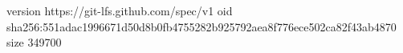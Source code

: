version https://git-lfs.github.com/spec/v1
oid sha256:551adac1996671d50d8b0fb4755282b925792aea8f776ece502ca82f43ab4870
size 349700

